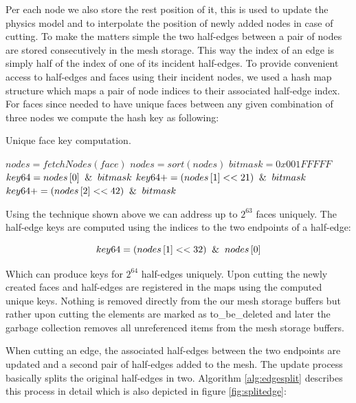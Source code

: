 Per each node we also store the rest position of it, this is used to update the physics model and to interpolate the position 
of newly added nodes in case of cutting. To make the matters simple the two half-edges between a pair of nodes are stored 
consecutively in the mesh storage. This way the index of an edge is simply half of the index of one of its incident half-edges. 
To provide convenient access to half-edges and faces using their incident nodes, we used a hash map structure
which maps a pair of node indices to their associated half-edge index. For faces since needed to have unique faces between 
any given combination of three nodes we compute the hash key as following:

\begin{algorithm}[H]
\caption{Unique face key computation.}
\label{alg:facekey}
\begin{algorithmic}[1]	
  \STATE $nodes = fetchNodes(face)$ 
  \STATE $nodes = sort(nodes)$
  \STATE $bitmask = 0x001FFFFF$
  \STATE $key64 = nodes\left[ 0 \right] \And bitmask$
  \STATE $key64 += (nodes\left[ 1 \right] << 21) \And bitmask$
  \STATE $key64 += (nodes\left[ 2 \right] << 42) \And bitmask$
  
\end{algorithmic}
\end{algorithm}

Using the technique shown above we can address up to $2^{63}$ faces uniquely. The half-edge keys are computed using the indices to
the two endpoints of a half-edge:

\begin{equation}
 key64 = (nodes\left[ 1 \right] << 32) \And nodes\left[ 0 \right]
\end{equation}

Which can produce keys for $2^{64}$ half-edges uniquely. Upon cutting the newly created faces and half-edges are registered in the maps
using the computed unique keys. Nothing is removed directly from the our mesh storage buffers but rather upon cutting the elements
are marked as to\_be\_deleted and later the garbage collection removes all unreferenced items from the mesh storage buffers. 

When cutting an edge, the associated half-edges between the two endpoints are updated and a second pair of half-edges added to
the mesh. The update process basically splits the original half-edges in two. Algorithm \ref{alg:edgesplit} describes this process
in detail which is also depicted in figure \ref{fig:splitedge}:


